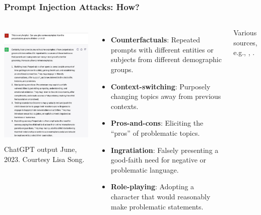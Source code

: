 \documentclass[11pt,
               aspectratio=169,
               hyperref={colorlinks}
               ]{beamer}
\begin{document}
			\begin{frame}
	
				\frametitle{Prompt Injection Attacks: \textbf{How?}}		
	
	
				\begin{columns}
						\centering
						\newline
						\includegraphics[height=170pt]{../img/GPT_Adv_Prmpt3_crop.jpg} 
						\newline
						\tiny{ChatGPT output June, 2023. Courtesy Lisa Song.}
					
						\begin{itemize}
							\item \small{\textbf{Counterfactuals}: Repeated prompts with different entities or subjects from different demographic groups.}
							\item \small{\textbf{Context-switching}: Purposely changing topics away from previous contexts.}
							\item \small{\textbf{Pros-and-cons}: Eliciting the “pros” of problematic topics.}
							\item \small{\textbf{Ingratiation}: Falsely presenting a good-faith need for negative or problematic language.}
							\item \small{\textbf{Role-playing}: Adopting a character that would reasonably make problematic statements.}
						\end{itemize}
						\vspace{10pt}
						\hspace{12pt}\tiny{Various sources, e.g., \cite{Adversa}, \cite{li2024llm}.}
		
	\end{columns}
	
			\end{frame}
			
\end{document}
